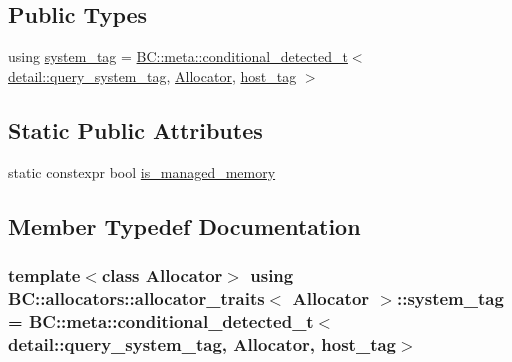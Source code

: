 \subsection*{Public Types}
\begin{DoxyCompactItemize}
\item 
using \hyperlink{structBC_1_1allocators_1_1allocator__traits_aa0f0a6c79a954a7801831eccc9a30f37}{system\+\_\+tag} = \hyperlink{namespaceBC_1_1meta_a96ed28f49a8ffe8f0bae28da99e6ee18}{B\+C\+::meta\+::conditional\+\_\+detected\+\_\+t}$<$ \hyperlink{namespaceBC_1_1allocators_1_1detail_a3443ef6fdbe2c417651fec71fa98dda8}{detail\+::query\+\_\+system\+\_\+tag}, \hyperlink{namespaceBC_a934f94b17b06290e6b241e5f59930c5f}{Allocator}, \hyperlink{structBC_1_1host__tag}{host\+\_\+tag} $>$
\end{DoxyCompactItemize}
\subsection*{Static Public Attributes}
\begin{DoxyCompactItemize}
\item 
static constexpr bool \hyperlink{structBC_1_1allocators_1_1allocator__traits_a6c6c9f87486c91b1404f8ff01328641c}{is\+\_\+managed\+\_\+memory}
\end{DoxyCompactItemize}


\subsection{Member Typedef Documentation}
\subsubsection[{\texorpdfstring{system\+\_\+tag}{system_tag}}]{\setlength{\rightskip}{0pt plus 5cm}template$<$class Allocator$>$ using {\bf B\+C\+::allocators\+::allocator\+\_\+traits}$<$ {\bf Allocator} $>$\+::{\bf system\+\_\+tag} =  {\bf B\+C\+::meta\+::conditional\+\_\+detected\+\_\+t}$<$ {\bf detail\+::query\+\_\+system\+\_\+tag}, {\bf Allocator}, {\bf host\+\_\+tag}$>$}\hypertarget{structBC_1_1allocators_1_1allocator__traits_aa0f0a6c79a954a7801831eccc9a30f37}{}\label{structBC_1_1allocators_1_1allocator__traits_aa0f0a6c79a954a7801831eccc9a30f37}


